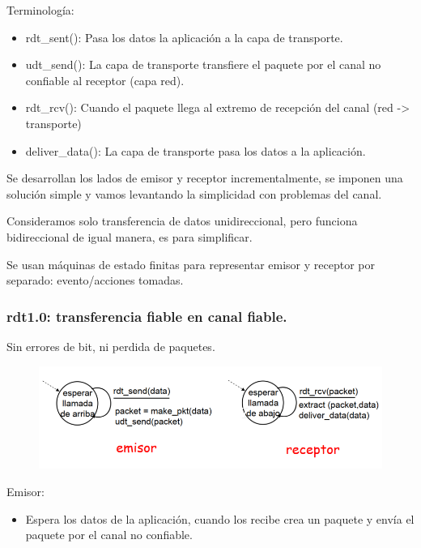 \documentclass[12pt, twoside, openright]{report} %
\begin{document}
	Terminología:

    \begin{itemize}
    \item
      rdt\_sent(): Pasa los datos la aplicación a la capa de transporte.
    \item
      udt\_send(): La capa de transporte transfiere el paquete por el
      canal no confiable al receptor (capa red).
    \item
      rdt\_rcv(): Cuando el paquete llega al extremo de recepción del
      canal (red -\textgreater{} transporte)
    \item
      deliver\_data(): La capa de transporte pasa los datos a la
      aplicación.
    \end{itemize}

	Se desarrollan los lados de emisor y receptor incrementalmente, se
    imponen una solución simple y vamos levantando la simplicidad con
    problemas del canal.

	Consideramos solo transferencia de datos unidireccional, pero
    funciona bidireccional de igual manera, es para simplificar.

	Se usan máquinas de estado finitas para representar emisor y
    receptor por separado: evento/acciones tomadas.

\subsubsection{rdt1.0: transferencia fiable en canal fiable.}

      Sin errores de bit, ni perdida de paquetes.

	  \begin{figure}[H]
		{\includegraphics[scale=.45]{Untitled 10.png}}
	\end{figure}
   
      Emisor:

      \begin{itemize}
      \item
        Espera los datos de la aplicación, cuando los recibe crea un
        paquete y envía el paquete por el canal no confiable.
      \end{itemize}
\end{document}
